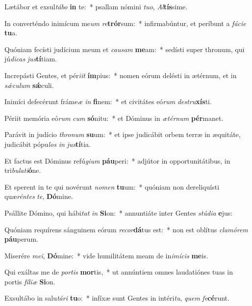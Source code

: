 \item Lætábor et exsul\textit{tá}\textit{bo} \textbf{in} te:~* psallam nómini \textit{tu}\textit{o}, \textit{Al}\textbf{tís}sime.
\item In converténdo inimícum me\textit{um} \textit{re}\textbf{trór}sum:~* infirmabúntur, et períbunt a \textit{fá}\textit{ci}\textit{e} \textbf{tu}a.
\item Quóniam fecísti judícium meum et \textit{cau}\textit{sam} \textbf{me}am:~* sedísti super thronum, qui jú\textit{di}\textit{cas} \textit{jus}\textbf{tí}tiam.
\item Increpásti Gentes, et pér\textit{i}\textit{it} \textbf{ím}pius:~* nomen eórum delésti in ætérnum, et in \textit{sǽ}\textit{cu}\textit{lum} \textbf{sǽ}culi.
\item Inimíci defecérunt fráme\textit{æ} \textit{in} \textbf{fi}nem:~* et civitátes eó\textit{rum} \textit{de}\textit{stru}\textbf{xís}ti.
\item Périit memória eó\textit{rum} \textit{cum} \textbf{só}nitu:~* et Dóminus in \textit{æ}\textit{tér}\textit{num} \textbf{pér}manet.
\item Parávit in judício \textit{thro}\textit{num} \textbf{su}um:~* et ipse judicábit orbem terræ in æquitáte, judicábit pópu\textit{los} \textit{in} \textit{jus}\textbf{tí}tia.
\item Et factus est Dóminus refú\textit{gi}\textit{um} \textbf{páu}peri:~* adjútor in opportunitátibus, in tri\textit{bu}\textit{la}\textit{ti}\textbf{ó}ne.
\item Et sperent in te qui novérunt \textit{no}\textit{men} \textbf{tu}um:~* quóniam non dereliquísti quæ\textit{rén}\textit{tes} \textit{te}, \textbf{Dó}mine.
\item Psállite Dómino, qui hábi\textit{tat} \textit{in} \textbf{Si}on:~* annuntiáte inter Gentes \textit{stú}\textit{di}\textit{a} \textbf{e}jus:
\item Quóniam requírens sánguinem eórum \textit{re}\textit{cor}\textbf{dá}tus est:~* non est oblítus \textit{cla}\textit{mó}\textit{rem} \textbf{páu}perum.
\item Miserére \textit{me}\textit{i}, \textbf{Dó}mine:~* vide humilitátem meam de in\textit{i}\textit{mí}\textit{cis} \textbf{me}is.
\item Qui exáltas me de \textit{por}\textit{tis} \textbf{mor}tis,~* ut annúntiem omnes laudatiónes tuas in portis \textit{fí}\textit{li}\textit{æ} \textbf{Si}on.
\item Exsultábo in salu\textit{tá}\textit{ri} \textbf{tu}o:~* infíxæ sunt Gentes in intéri\textit{tu}, \textit{quem} \textit{fe}\textbf{cé}runt.

